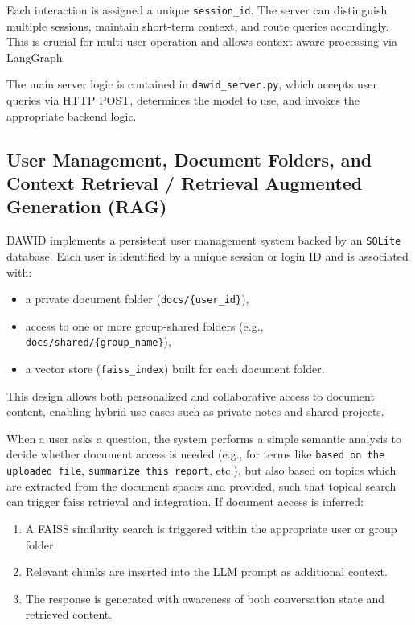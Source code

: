 Each interaction is assigned a unique \texttt{session\_id}. The server can distinguish multiple sessions, maintain short-term context, and route queries accordingly. This is crucial for multi-user operation and allows context-aware processing via LangGraph.

The main server logic is contained in \texttt{dawid\_server.py}, which accepts user queries via HTTP POST, determines the model to use, and invokes the appropriate backend logic.

%
\subsection*{User Management, Document Folders, and Context Retrieval / Retrieval Augmented Generation (RAG)}

DAWID implements a persistent user management system backed by an \texttt{SQLite} database. Each user is identified by a unique session or login ID and is associated with:

\begin{itemize}
    \item a private document folder (\texttt{docs/\{user\_id\}}),
    \item access to one or more group-shared folders (e.g., \texttt{docs/shared/\{group\_name\}}),
    \item a vector store (\texttt{faiss\_index}) built for each document folder.
\end{itemize}

This design allows both personalized and collaborative access to document content, enabling hybrid use cases such as private notes and shared projects.

When a user asks a question, the system performs a simple semantic analysis to decide whether document access is needed (e.g., for terms like \texttt{based on the uploaded file}, \texttt{summarize this report}, etc.), but also based on topics which are extracted from the document spaces and provided, such that topical search can trigger faiss retrieval and integration. If document access is inferred:

\begin{enumerate}
    \item A FAISS similarity search is triggered within the appropriate user or group folder.
    \item Relevant chunks are inserted into the LLM prompt as additional context.
    \item The response is generated with awareness of both conversation state and retrieved content.
\end{enumerate}

